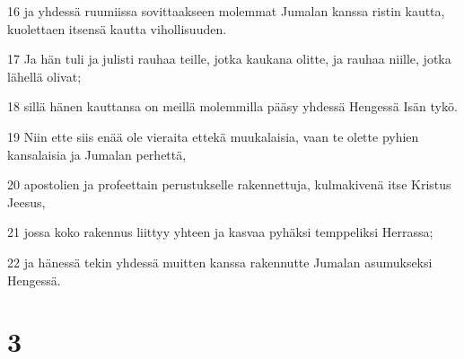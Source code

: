 \par 16 ja yhdessä ruumiissa sovittaakseen molemmat Jumalan kanssa ristin kautta, kuolettaen itsensä kautta vihollisuuden.
\par 17 Ja hän tuli ja julisti rauhaa teille, jotka kaukana olitte, ja rauhaa niille, jotka lähellä olivat;
\par 18 sillä hänen kauttansa on meillä molemmilla pääsy yhdessä Hengessä Isän tykö.
\par 19 Niin ette siis enää ole vieraita ettekä muukalaisia, vaan te olette pyhien kansalaisia ja Jumalan perhettä,
\par 20 apostolien ja profeettain perustukselle rakennettuja, kulmakivenä itse Kristus Jeesus,
\par 21 jossa koko rakennus liittyy yhteen ja kasvaa pyhäksi temppeliksi Herrassa;
\par 22 ja hänessä tekin yhdessä muitten kanssa rakennutte Jumalan asumukseksi Hengessä.

\chapter{3}

